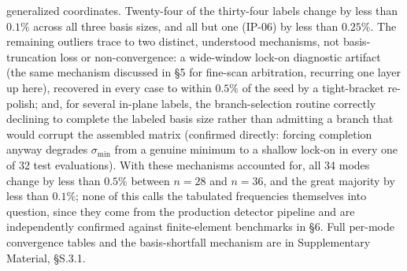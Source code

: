 \documentclass[11pt]{article}
\begin{document}
generalized coordinates. Twenty-four of the thirty-four labels change by
less than $0.1\%$ across all three basis sizes, and all but one (IP-06)
by less than $0.25\%$. The remaining outliers trace to two distinct,
understood mechanisms, not basis-truncation loss or
non-convergence: a wide-window lock-on diagnostic artifact (the same
mechanism discussed in \S5 for fine-scan arbitration, recurring one layer
up here), recovered in every case to within $0.5\%$ of the seed by a
tight-bracket re-polish; and, for several in-plane labels, the
branch-selection routine correctly declining to complete the labeled
basis size rather than admitting a branch that would corrupt the
assembled matrix (confirmed directly: forcing completion anyway degrades
$\sigma_{\min}$ from a genuine minimum to a shallow lock-on in every one
of 32 test evaluations). With these mechanisms accounted for, all 34
modes change by less than $0.5\%$ between $n=28$ and $n=36$, and the
great majority by less than $0.1\%$; none of this calls the tabulated
frequencies themselves into question, since they come from the
production detector pipeline and are independently confirmed against
finite-element benchmarks in \S6. Full per-mode convergence tables and
the basis-shortfall mechanism are in Supplementary Material, §S.3.1.
\end{document}

